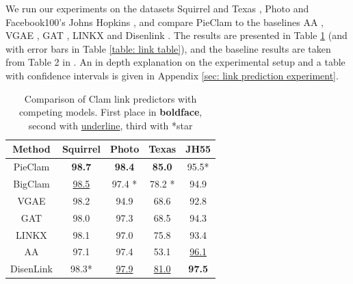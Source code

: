 \documentclass{article}
\theoremstyle{plain}
\theoremstyle{definition}
\theoremstyle{remark}
\newcommand{\dan}[1]{{{\textcolor{blue}{ {#1}\textbf{}}}}}
\begin{document}
We run our experiments on the datasets Squirrel and Texas \cite{pei2020texasquirrel}, Photo \cite{shchur2018photo} and Facebook100's Johns Hopkins \cite{lim2021hopkins}, and compare PieClam to the baselines AA \cite{adamic2003friends}, VGAE \cite{kipf2016variational}, GAT \cite{GAT}, LINKX \cite{lim2021linkx} and Disenlink \cite{zhou2022disenlink}. The results are presented in Table \ref{table: link table0} (and with error bars in Table \ref{table: link table}),  %
 and the baseline results are taken from Table 2 in \cite{zhou2022disenlink}. An in depth explanation on the experimental setup and a table with confidence intervals is given in Appendix \ref{sec: link prediction experiment}.
 \begin{table}[t]
 \footnotesize
    \centering
    \begin{tabular}{|c|c|c|c|c|}
        \hline
        Method  & Squirrel        & Photo           & Texas        & JH55 \\
        \hline
        PieClam & \textbf{98.7} & \textbf{98.4}     &   \textbf{85.0}           & 95.5*     \\
        \hline
        BigClam & \underline{98.5}& 97.4 *  & 78.2 *& 94.9  \\
        VGAE    &   98.2   &94.9   & 68.6  & 92.8  \\
        GAT     &   98.0    &97.3   & 68.5  &   94.3 \\
        LINKX   &   98.1    &97.0   & 75.8  &   93.4  \\
        AA      &   97.1  &97.4   & 53.1  &  \underline{96.1}  \\
        DisenLink & 98.3* & \underline{97.9} & \underline{81.0} &   \textbf{97.5} \\
        \hline
    \end{tabular}
    \caption{Comparison of Clam link predictors with competing models. First place in \textbf{boldface}, second with \underline{underline}, third with *star}
    \label{table: link table0}
\end{table}
\end{document}
